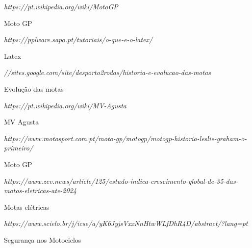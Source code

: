 \documentclass{report}
\begin{document}
\begin{thebibliography}{6}

\textit{https://pt.wikipedia.org/wiki/MotoGP}

Moto GP


\textit{https://pplware.sapo.pt/tutoriais/o-que-e-o-latex/}

Latex


\textit{//sites.google.com/site/desporto2rodas/historia-e-evolucao-das-motas}

Evolução das motas


\textit{https://pt.wikipedia.org/wiki/MV-Agusta}

MV Agusta


\textit{https://www.motosport.com.pt/moto-gp/motogp/motogp-historia-leslie-graham-o-primeiro/}

Moto GP



\textit{https://www.zev.news/article/125/estudo-indica-crescimento-global-de-35-das-motos-eletricas-ate-2024}

Motas elétricas


\textit{https://www.scielo.br/j/icse/a/yK6JyjsVxxNnHtwWLfDhR4D/abstract/?lang=pt}

Segurança nos Motociclos
\end{thebibliography}
\end{document}
